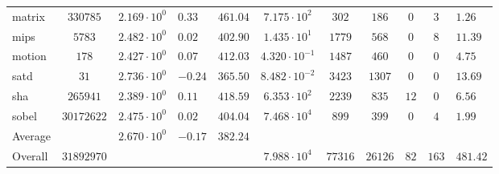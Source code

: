 \begin{tabular}{|l|c|HHc|c|c|c|c|cH|}
matrix        & $ 330785   $ & $ 2.169 \cdot 10^{0} $ & $ 0.33  $ & $ 461.04 $ & $ 7.175 \cdot 10^{2}  $ & $ 302   $ & $ 186   $ & $ 0   $ & $ 3   $ & $ 1.26    $ \\
mips          & $ 5783     $ & $ 2.482 \cdot 10^{0} $ & $ 0.02  $ & $ 402.90 $ & $ 1.435 \cdot 10^{1}  $ & $ 1779  $ & $ 568   $ & $ 0   $ & $ 8   $ & $ 11.39   $ \\
motion        & $ 178      $ & $ 2.427 \cdot 10^{0} $ & $ 0.07  $ & $ 412.03 $ & $ 4.320 \cdot 10^{-1} $ & $ 1487  $ & $ 460   $ & $ 0   $ & $ 0   $ & $ 4.75    $ \\
satd          & $ 31       $ & $ 2.736 \cdot 10^{0} $ & $ -0.24 $ & $ 365.50 $ & $ 8.482 \cdot 10^{-2} $ & $ 3423  $ & $ 1307  $ & $ 0   $ & $ 0   $ & $ 13.69   $ \\
sha           & $ 265941   $ & $ 2.389 \cdot 10^{0} $ & $ 0.11  $ & $ 418.59 $ & $ 6.353 \cdot 10^{2}  $ & $ 2239  $ & $ 835   $ & $ 12  $ & $ 0   $ & $ 6.56    $ \\
sobel         & $ 30172622 $ & $ 2.475 \cdot 10^{0} $ & $ 0.02  $ & $ 404.04 $ & $ 7.468 \cdot 10^{4}  $ & $ 899   $ & $ 399   $ & $ 0   $ & $ 4   $ & $ 1.99    $ \\
\hline
Average       & $          $ & $ 2.670 \cdot 10^{0} $ & $ -0.17 $ & $ 382.24 $ & $                     $ & $       $ & $       $ & $     $ & $     $ & $         $ \\
\hline
Overall       & $ 31892970 $ & $                    $ & $       $ & $        $ & $ 7.988 \cdot 10^{4}  $ & $ 77316 $ & $ 26126 $ & $ 82  $ & $ 163 $ & $ 481.42  $ \\
\hline
\end{tabular}
